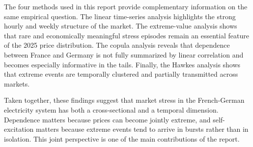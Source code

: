 The four methods used in this report provide complementary information on the same empirical question. The linear time-series analysis highlights the strong hourly and weekly structure of the market. The extreme-value analysis shows that rare and economically meaningful stress episodes remain an essential feature of the 2025 price distribution. The copula analysis reveals that dependence between France and Germany is not fully summarized by linear correlation and becomes especially informative in the tails. Finally, the Hawkes analysis shows that extreme events are temporally clustered and partially transmitted across markets.

Taken together, these findings suggest that market stress in the French-German electricity system has both a cross-sectional and a temporal dimension. Dependence matters because prices can become jointly extreme, and self-excitation matters because extreme events tend to arrive in bursts rather than in isolation. This joint perspective is one of the main contributions of the report.
